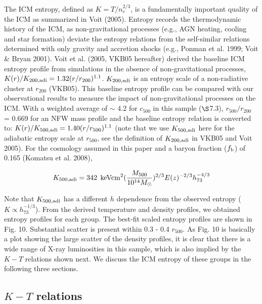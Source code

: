 \documentclass{aastex}
\begin{document}
The ICM entropy, defined as $K = T / n_{e}^{2/3}$, is a fundamentally important
quality of the ICM as summarized in Voit (2005). Entropy
records the thermodynamic history of the ICM, as non-gravitational processes (e.g.,
AGN heating, cooling and star formation) deviate the entropy relations from the
self-similar relations determined with only gravity and accretion shocks
(e.g., Ponman et al. 1999; Voit \& Bryan 2001).
Voit et al. (2005, VKB05 hereafter) derived the baseline ICM
entropy profile from simulations in the absence of non-gravitational processes,
$K(r) / K_{\rm 200, adi} = 1.32 (r/r_{200})^{1.1}$.
$K_{\rm 200, adi}$ is an entropy scale of a non-radiative cluster at $r_{200}$ (VKB05).
This baseline entropy profile can be compared with our observational results
to measure the impact of non-gravitational processes on the ICM. 
With a weighted average of $\sim$ 4.2 for $c_{500}$ in this sample ($\S$7.3),
$r_{500}/r_{200}$ = 0.669 for an NFW mass profile and the baseline entropy relation is converted to:
$K(r) / K_{\rm 500, adi} = 1.40 (r/r_{500})^{1.1}$ (note that we use $K_{\rm 500, adi}$
here for the adiabatic entropy scale at $r_{500}$, see the definition of $K_{\rm 200, adi}$
in VKB05 and Voit 2005).
For the cosmology assumed in this paper and a baryon fraction ($f_{\rm b}$) of 0.165
(Komatsu et al. 2008),

\begin{equation}  \label{K500}
K_{\rm 500, adi} = 342 \hspace{0.16cm} {\rm keV cm^{2}} (\frac{M_{500}}{10^{14} M_{\odot}})^{2/3} E(z)^{-2/3} h_{73}^{-4/3}
\end{equation}

Note that $K_{\rm 500, adi}$ has a different $h$ dependence from the observed entropy
($K \propto h_{73}^{-1/3}$).
From the derived temperature and density profiles, we obtained entropy profiles
for each group. The best-fit scaled entropy profiles are shown in Fig. 10.
Substantial scatter is present within 0.3 - 0.4 $r_{500}$.
As Fig. 10 is basically a plot showing the large scatter of the density profiles,
it is clear that there is a wide range of X-ray luminosities in this sample,
which is also implied by the $K - T$ relations shown next.
We discuss the ICM entropy of these groups in the following three sections.

\subsection{$K - T$ relations}
\end{document}
